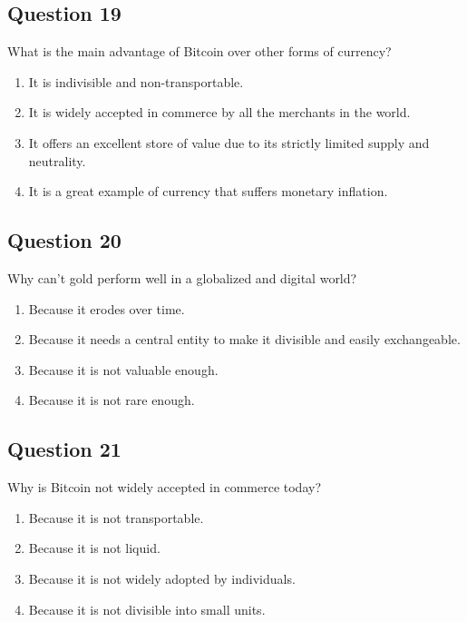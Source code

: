\documentclass[12pt,a4paper]{article}
\begin{document}
\bigskip


\subsection*{Question 19}
What is the main advantage of Bitcoin over other forms of currency?

\begin{enumerate}[label=\Alph*., leftmargin=*]
\item It is indivisible and non-transportable.
\item It is widely accepted in commerce by all the merchants in the world.
\item It offers an excellent store of value due to its strictly limited supply and neutrality.
\item It is a great example of currency that suffers monetary inflation.
\end{enumerate}

\bigskip


\subsection*{Question 20}
Why can't gold perform well in a globalized and digital world?

\begin{enumerate}[label=\Alph*., leftmargin=*]
\item Because it erodes over time.
\item Because it needs a central entity to make it divisible and easily exchangeable.
\item Because it is not valuable enough.
\item Because it is not rare enough.
\end{enumerate}

\bigskip


\subsection*{Question 21}
Why is Bitcoin not widely accepted in commerce today?

\begin{enumerate}[label=\Alph*., leftmargin=*]
\item Because it is not transportable.
\item Because it is not liquid.
\item Because it is not widely adopted by individuals.
\item Because it is not divisible into small units.
\end{enumerate}
\end{document}
